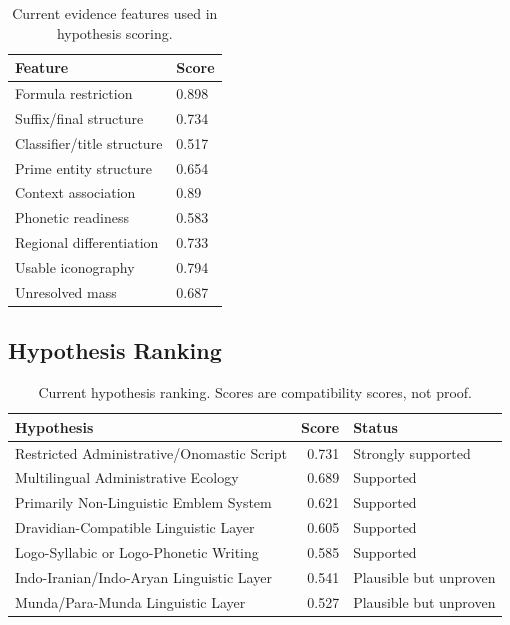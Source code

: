 \begin{table}[htbp]
\centering
\begin{tabular}{ll}
\toprule
\textbf{Feature} & \textbf{Score} \\
\midrule
Formula restriction & 0.898 \\
Suffix/final structure & 0.734 \\
Classifier/title structure & 0.517 \\
Prime entity structure & 0.654 \\
Context association & 0.89 \\
Phonetic readiness & 0.583 \\
Regional differentiation & 0.733 \\
Usable iconography & 0.794 \\
Unresolved mass & 0.687 \\
\bottomrule
\end{tabular}
\caption{Current evidence features used in hypothesis scoring.}
\end{table}

\subsection{Hypothesis Ranking}

\begin{table}[htbp]
\centering
\footnotesize
\begin{tabular}{p{}rp{}}
\toprule
\textbf{Hypothesis} & \textbf{Score} & \textbf{Status} \\
\midrule
Restricted Administrative/Onomastic Script & 0.731 & Strongly supported \\
Multilingual Administrative Ecology & 0.689 & Supported \\
Primarily Non-Linguistic Emblem System & 0.621 & Supported \\
Dravidian-Compatible Linguistic Layer & 0.605 & Supported \\
Logo-Syllabic or Logo-Phonetic Writing & 0.585 & Supported \\
Indo-Iranian/Indo-Aryan Linguistic Layer & 0.541 & Plausible but unproven \\
Munda/Para-Munda Linguistic Layer & 0.527 & Plausible but unproven \\
\bottomrule
\end{tabular}
\caption{Current hypothesis ranking. Scores are compatibility scores, not proof.}
\end{table}


